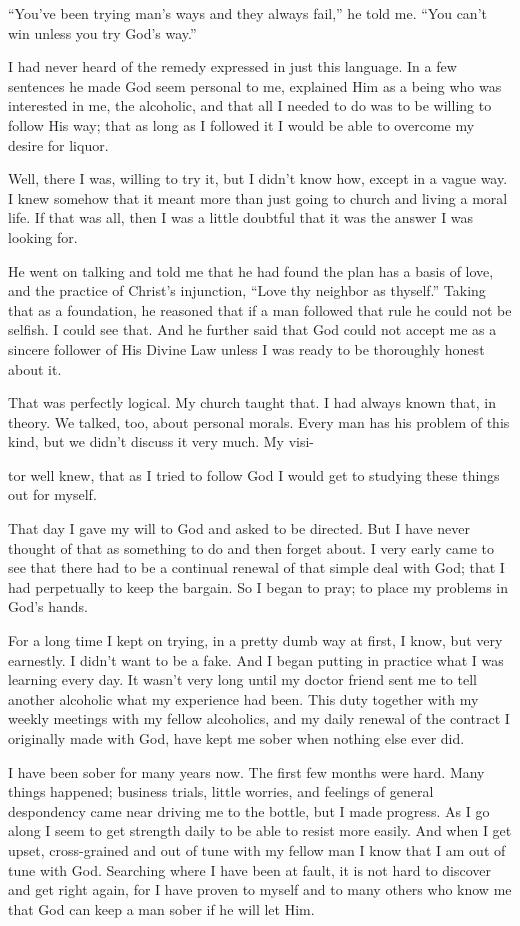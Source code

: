 \begin{biblechapter}
“You’ve been trying man’s ways and they always fail,” he told me. “You can’t win unless you try God’s way.”

I had never heard of the remedy expressed in just this language. In a few sentences he made God seem personal to me, explained Him as a being who was interested in me, the alcoholic, and that all I needed to do was to be willing to follow His way; that as long as I followed it I would be able to overcome my desire for liquor.

Well, there I was, willing to try it, but I didn’t know how, except in a vague way. I knew somehow that it meant more than just going to church and living a moral life. If that was all, then I was a little doubtful that it was the answer I was looking for.

He went on talking and told me that he had found the plan has a basis of love, and the practice of Christ’s injunction, “Love thy neighbor as thyself.” Taking that as a foundation, he reasoned that if a man followed that rule he could not be selfish. I could see that. And he further said that God could not accept me as a sincere follower of His Divine Law unless I was ready to be thoroughly honest about it.

That was perfectly logical. My church taught that. I had always known that, in theory. We talked, too, about personal morals. Every man has his problem of this kind, but we didn’t discuss it very much. My visi-

tor well knew, that as I tried to follow God I would get to studying these things out for myself.

That day I gave my will to God and asked to be directed. But I have never thought of that as something to do and then forget about. I very early came to see that there had to be a continual renewal of that simple deal with God; that I had perpetually to keep the bargain. So I began to pray; to place my problems in God’s hands.

For a long time I kept on trying, in a pretty dumb way at first, I know, but very earnestly. I didn’t want to be a fake. And I began putting in practice what I was learning every day. It wasn’t very long until my doctor friend sent me to tell another alcoholic what my experience had been. This duty together with my weekly meetings with my fellow alcoholics, and my daily renewal of the contract I originally made with God, have kept me sober when nothing else ever did.

I have been sober for many years now. The first few months were hard. Many things happened; business trials, little worries, and feelings of general despondency came near driving me to the bottle, but I made progress. As I go along I seem to get strength daily to be able to resist more easily. And when I get upset, cross-grained and out of tune with my fellow man I know that I am out of tune with God. Searching where I have been at fault, it is not hard to discover and get right again, for I have proven to myself and to many others who know me that God can keep a man sober if he will let Him.
\end{biblechapter}
